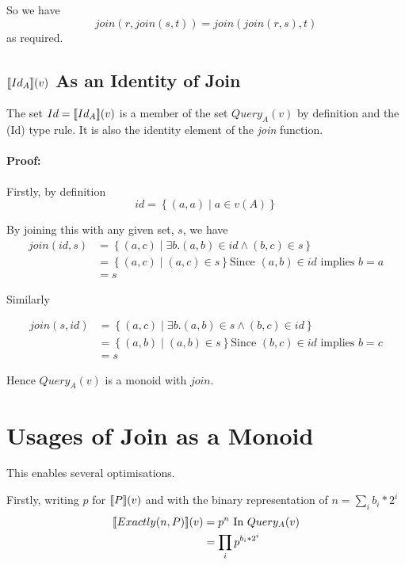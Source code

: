 \documentclass[12pt,a4paper,twoside,openright]{report}
\newcommand\mathName[1]{\textit{#1}}
\newcommand{\db}[1]{{\bf [\![}#1{\bf ]\!]}}
\newcommand{\deno}[1]{\db{#1}(v)}
\newcommand{\setComp}[2]{\left\lbrace #1 \mid #2 \right\rbrace}
\newcommand{\queryT}[1]{Query_{#1}(v)}
\begin{document}
So we have \[ join(r, join(s, t)) = join(join(r, s), t) \] as required.

\subsection{$\deno{Id_A}$ As an Identity of Join}

The set $Id = \deno{Id_A}$ is a member of the set $\queryT{A}$ by definition and the (Id) type rule. It is also the identity element of the \mathName{join} function.

\paragraph{Proof:} Firstly, by definition
\[ id = \setComp{(a, a)}{a \in v(A)}\]

By joining this with any given set, $s$, we have
\begin{equation}
\label{LeftID}
\begin{split}
join(id, s) & = \setComp{(a, c)}{\exists b. (a, b) \in id \wedge (b, c) \in s}\\
            & = \setComp{(a, c)}{(a, c) \in s} \mbox{Since $(a, b) \in id$ implies $b = a$}\\
            & = s
\end{split}
\end{equation}

Similarly

\begin{equation}
\label{RightID}
\begin{split}
join(s, id) & = \setComp{(a, c)}{\exists b. (a, b) \in s \wedge (b, c) \in id}\\
            & = \setComp{(a, b)}{(a, b) \in s} \mbox{Since $(b, c) \in id$ implies $b = c$}\\
            & = s
\end{split}
\end{equation}



Hence $\queryT{A}$ is a monoid with $join$. 
	
\section{Usages of Join as a Monoid}
\label{exactlyOpt}
This enables several optimisations.

Firstly, writing $p$ for $\deno{P}$ and with the binary representation of $n = \sum_i{b_i * 2^{i}}$
\begin{equation}\label{ExactlyReordering}
\begin{split}
\deno{Exactly(n, P)} & = p^{n} \mbox{ In $\queryT{A}$}\\
					& = \prod_i {p^{b_i * 2^i} }
\end{split}
\end{equation}
\end{document}
